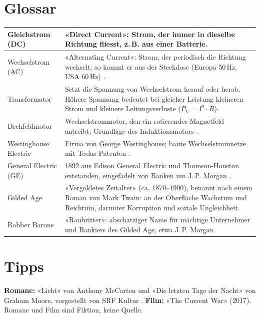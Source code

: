 \documentclass[10pt,a4paper]{article}
\begin{document}
\newpage

\section{Glossar}
{\small
\begin{tabularx}{\linewidth}{|C{31mm}|Y|}
  \hline
  Gleichstrom (DC) & «Direct Current»: Strom, der immer in dieselbe Richtung fliesst, z.\,B. aus einer Batterie. \\
    \hline
  Wechselstrom (AC) & «Alternating Current»: Strom, der periodisch die Richtung wechselt; so kommt er aus der
    Steckdose (Europa 50\,Hz, USA 60\,Hz) \cite{iec}. \\ \hline
  Transformator & Setzt die Spannung von Wechselstrom herauf oder herab. Höhere Spannung bedeutet bei gleicher
    Leistung kleineren Strom und kleinere Leitungsverluste ($P_\mathrm{V} = I^2 \cdot R$). \\ \hline
  Drehfeldmotor & Wechselstrommotor, den ein rotierendes Magnetfeld antreibt; Grundlage des Induktionsmotors
    \cite[994]{kaick}. \\ \hline
  Westinghouse Electric & Firma von George Westinghouse; baute Wechselstromnetze mit Teslas Patenten
    \cite[994]{kaick}. \\ \hline
  General Electric (GE) & 1892 aus Edison General Electric und Thomson-Houston entstanden, eingefädelt von Banken
    um J.\,P. Morgan . \\ \hline
  Gilded Age & «Vergoldetes Zeitalter» (ca. 1870--1900), benannt nach einem Roman von Mark Twain: an der
    Oberfläche Wachstum und Reichtum, darunter Korruption und soziale Ungleichheit. \\ \hline
  Robber Barons & «Raubritter»: abschätziger Name für mächtige Unternehmer und Bankiers des Gilded Age, etwa
    J.\,P. Morgan. \\ \hline
\end{tabularx}\par}

\section{Tipps}
\textbf{Romane:} «Licht» von Anthony McCarten und «Die letzten Tage der Nacht» von Graham Moore, vorgestellt von
SRF Kultur \cite{srf}. \textbf{Film:} «The Current War» (2017). Romane und Film sind Fiktion, keine Quelle.


\printbibliography[title=Quellen]
\end{document}
